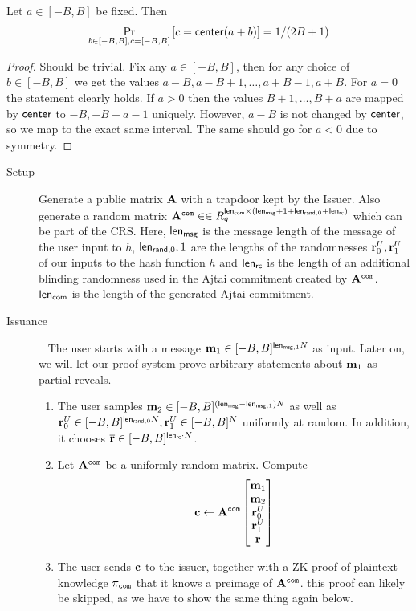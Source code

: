 \begin{lemma}
Let $a\in [-B,B]$ be fixed. Then 
\[
\Pr_{b\in [-B,B],c=[-B,B]}\left[ c=\mathsf{center}(a+b) \right]=1/(2B+1)
\]
\end{lemma}
\begin{proof}
Should be trivial. Fix any $a \in [-B,B]$, then for any choice of $b\in [-B,B]$ we get the values $a-B,a-B+1,\dots,a+B-1,a+B$. For $a=0$ the statement clearly holds. If $a>0$ then the values $B+1,\dots,B+a$ are mapped by $\mathsf{center}$ to $-B,-B+a-1$ uniquely. However, $a-B$ is not changed by $\mathsf{center}$, so we map to the exact same interval. The same should go for $a<0$ due to symmetry.
\end{proof}


\begin{description}
   \item[Setup] Generate a public matrix $\mathbf{A}$ with a trapdoor kept by the Issuer. Also generate a random matrix $\mathbf{A}^{\mathtt{com}}\in\in R_q^{\mathsf{len}_{\mathsf{com}}\times (\mathsf{len}_{\mathsf{msg}}+1+\mathsf{len}_{\mathsf{rand},0}+\mathsf{len}_{\mathsf{rc}})}$ which can be part of the CRS. Here, $\mathsf{len}_{\mathsf{msg}}$ is the message length of the message of the user input to $h$, $\mathsf{len}_{\mathsf{rand},0},1$ are the lengths of the randomnesses $\mathbf{r}_{0}^U,\mathbf{r}_{1}^U$ of our inputs to the hash function $h$ and $\mathsf{len}_{\mathsf{rc}}$ is the length of an additional blinding randomness used in the Ajtai commitment created by $\mathbf{A}^{\mathtt{com}}$. $\mathsf{len}_{\mathsf{com}}$ is the length of the generated Ajtai commitment.
    \item[Issuance]~ The user starts with a message $\mathbf{m}_1\in [-B,B]^{\mathsf{len}_{\mathsf{msg},1}N}$ as input. Later on, we will let our proof system prove arbitrary statements about $\mathbf{m}_1$ as partial reveals.
    \begin{enumerate}
        \item The user samples $\mathbf{m}_2\in [-B,B]^{(\mathsf{len}_{\mathsf{msg}}-\mathsf{len}_{\mathsf{msg},1})N}$ as well as $\mathbf{r}_{0}^U\in [-B,B]^{\mathsf{len}_{\mathsf{rand},0}N},\mathbf{r}_{1}^U\in [-B,B]^N$ uniformly at random. In addition, it chooses $\overline{\mathbf{r}}\in [-B,B]^{ \mathsf{len}_{\mathsf{rc}} \cdot N}$.
        \item Let $\mathbf{A}^{\mathtt{com}}$ be a uniformly random matrix. Compute $$\mathbf{c}\gets \mathbf{A}^{\mathtt{com}}\begin{bmatrix}
            \mathbf{m}_1\\\mathbf{m}_2\\\mathbf{r}_{0}^U \\ \mathbf{r}_{1}^U \\ \overline{\mathbf{r}}
        \end{bmatrix}$$
        \item The user sends $\mathbf{c}$ to the issuer, together with a ZK proof of plaintext knowledge $\pi_{\mathtt{com}}$ that it knows a preimage of $\mathbf{A}^{\mathtt{com}}$. {\color{blue} this proof can likely be skipped, as we have to show the same thing again below.}


\end{enumerate}
\end{description}
